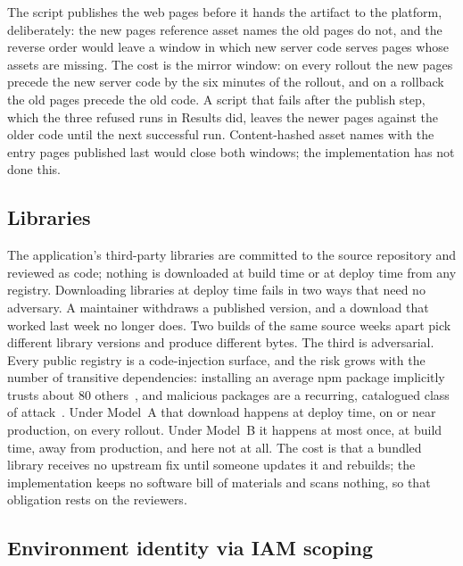 \documentclass[11pt]{article}
\begin{document}
The script publishes the web pages before it hands the artifact to the platform, deliberately: the new pages reference asset names the old pages do not, and the reverse order would leave a window in which new server code serves pages whose assets are missing. The cost is the mirror window: on every rollout the new pages precede the new server code by the six minutes of the rollout, and on a rollback the old pages precede the old code. A script that fails after the publish step, which the three refused runs in Results did, leaves the newer pages against the older code until the next successful run. Content-hashed asset names with the entry pages published last would close both windows; the implementation has not done this.

\subsection{Libraries}

The application's third-party libraries are committed to the source repository and reviewed as code; nothing is downloaded at build time or at deploy time from any registry. Downloading libraries at deploy time fails in two ways that need no adversary. A maintainer withdraws a published version, and a download that worked last week no longer does. Two builds of the same source weeks apart pick different library versions and produce different bytes. The third is adversarial. Every public registry is a code-injection surface, and the risk grows with the number of transitive dependencies: installing an average npm package implicitly trusts about 80 others~\cite{Zimmermann}, and malicious packages are a recurring, catalogued class of attack~\cite{Ohm,Ladisa}. Under Model~A that download happens at deploy time, on or near production, on every rollout. Under Model~B it happens at most once, at build time, away from production, and here not at all. The cost is that a bundled library receives no upstream fix until someone updates it and rebuilds; the implementation keeps no software bill of materials and scans nothing, so that obligation rests on the reviewers.

\subsection{Environment identity via IAM scoping}
\end{document}
